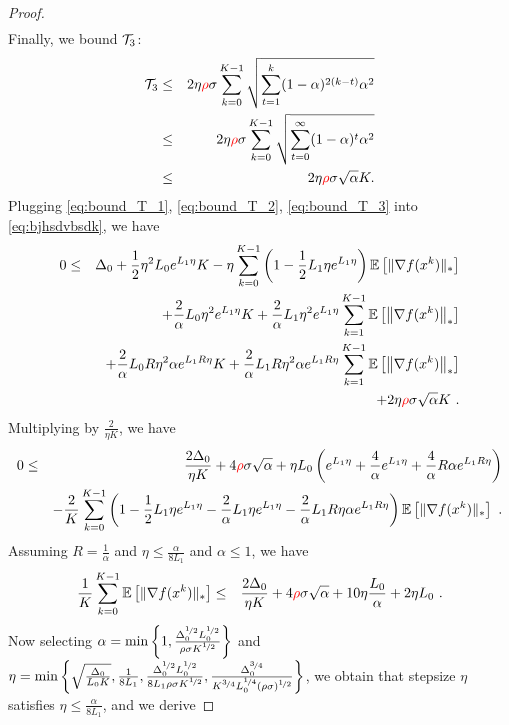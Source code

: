 \documentclass{article}
\begin{document}
\begin{proof}
\begin{eqnarray}
    \end{eqnarray}
    Finally, we bound $\mathcal{T}_3$:
    \begin{eqnarray}
        \mathcal{T}_3 &\leq& 2\eta{\color{red} \rho} \sigma \sum^{K-1}_{k=0}\sqrt{\sum_{t=1}^k (1-\alpha)^{2(k-t)}\alpha^2} \notag\\
        &\leq& 2\eta{\color{red} \rho} \sigma \sum^{K-1}_{k=0}\sqrt{\sum_{t=0}^{\infty} (1-\alpha)^{t}\alpha^2} \notag\\
        &\leq& 2\eta{\color{red} \rho} \sigma \sqrt{\alpha} K. \label{eq:bound_T_3}
    \end{eqnarray}
    Plugging \eqref{eq:bound_T_1}, \eqref{eq:bound_T_2}, \eqref{eq:bound_T_3} into \eqref{eq:bjhsdvbsdk}, we have 
    \begin{eqnarray*}
        0 &\leq& \Delta_0 +\frac{1}{2}\eta^2 L_0 e^{L_1\eta}K - \eta \sum^{K-1}_{k=0}\left(1-\frac{1}{2}L_1\eta e^{L_1\eta}\right){\mathbb{E}}\left[\|\nabla f(x^k)\|_*\right]\\
        && + \frac{2}{\alpha}L_0\eta^2 e^{L_1\eta} K + \frac{2}{\alpha}L_1\eta^2 e^{L_1\eta} \sum_{k=1}^{K-1} {\mathbb{E}}\left[\left\| \nabla f(x^k) \right\|_*\right]\\
        && + \frac{2}{\alpha}L_0R\eta^2\alpha e^{L_1R\eta} K + \frac{2}{\alpha}L_1R\eta^2\alpha e^{L_1R\eta} \sum_{k=1}^{K-1} {\mathbb{E}}\left[\left\| \nabla f(x^k) \right\|_*\right]\\
        && + 2\eta{\color{red} \rho} \sigma \sqrt{\alpha} K ~.
    \end{eqnarray*}
    Multiplying by $\frac{2}{\eta K}$, we have 
    \begin{eqnarray*}
        0 &\leq& \frac{2\Delta_0}{\eta K} + 4{\color{red} \rho} \sigma \sqrt{\alpha} +\eta L_0 \left( e^{L_1\eta} + \frac{4}{\alpha} e^{L_1\eta} + \frac{4}{\alpha} R\alpha e^{L_1R\eta} \right) \\
        &&- \frac{2}{K} \sum^{K-1}_{k=0}\left(1-\frac{1}{2}L_1\eta e^{L_1\eta} - \frac{2}{\alpha}L_1\eta e^{L_1\eta} - \frac{2}{\alpha}L_1R\eta\alpha e^{L_1R\eta}\right){\mathbb{E}}\left[\|\nabla f(x^k)\|_*\right] ~.
    \end{eqnarray*}
    Assuming $R = \frac{1}{\alpha}$ and $\eta \leq \frac{\alpha}{8L_1}$ and $\alpha \leq 1$, we have 
    \begin{eqnarray*}
         \frac{1}{K} \sum^{K-1}_{k=0}{\mathbb{E}}\left[\|\nabla f(x^k)\|_*\right]&\leq& \frac{2\Delta_0}{\eta K} + 4{\color{red} \rho} \sigma \sqrt{\alpha} + 10\eta \frac{L_0}{\alpha} + 2\eta L_0 ~.
    \end{eqnarray*}
    Now selecting $\alpha = \min\left\{1, \frac{\Delta_0^{\nicefrac{1}{2}}L_0^{\nicefrac{1}{2}}}{\rho\sigma K^{\nicefrac{1}{2}}}\right\}$ and $\eta = \min\left\{\sqrt{\frac{\Delta_0}{L_0 K}}, \frac{1}{8L_1}, \frac{\Delta_0^{\nicefrac{1}{2}}L_0^{\nicefrac{1}{2}}}{8L_1\rho\sigma K^{\nicefrac{1}{2}}}, \frac{\Delta_0^{\nicefrac{3}{4}}}{K^{\nicefrac{3}{4}} L_0^{\nicefrac{1}{4}}(\rho\sigma)^{\nicefrac{1}{2}}}\right\}$, we obtain that stepsize $\eta$ satisfies $\eta \leq \frac{\alpha}{8L_1}$, and we derive 

\end{proof}
\end{document}
